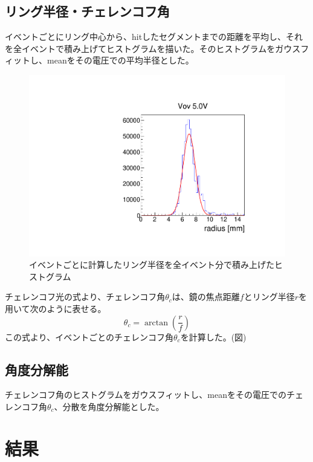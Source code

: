 \documentclass[uplatex, titlepage, dvipdfmx, 12pt, a4paper]{jsreport}
\begin{document}
  \section{リング半径・チェレンコフ角}
    イベントごとにリング中心から、hitしたセグメントまでの距離を平均し、それを全イベントで積み上げてヒストグラムを描いた。そのヒストグラムをガウスフィットし、meanをその電圧での平均半径とした。
    \begin{figure}[h]
      \begin{center} 
        \includegraphics[scale=0.5, clip]{image/radius.pdf}
        \caption{イベントごとに計算したリング半径を全イベント分で積み上げたヒストグラム} 
        \label{fig:5Vradius} 
      \end{center}
    \end{figure}
    チェレンコフ光の式より、チェレンコフ角$\theta_{c}$は、鏡の焦点距離$f$とリング半径$r$を用いて次のように表せる。
    \begin{equation}
        \theta_{c} = \arctan \left(\frac{r}{f} \right)
    \end{equation}
    この式より、イベントごとのチェレンコフ角$\theta_{c}$を計算した。(図)

  \section{角度分解能}
    チェレンコフ角のヒストグラムをガウスフィットし、meanをその電圧でのチェレンコフ角$\theta_{c}$、分散を角度分解能とした。

\chapter{結果}
\end{document}
